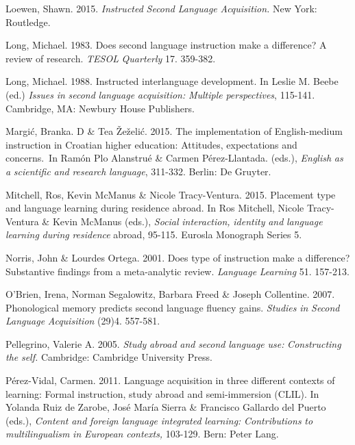 Loewen, Shawn. 2015. \textit{Instructed} \textit{Second} \textit{Language} \textit{Acquisition.} New York: Routledge.

Long, Michael. 1983. Does second language instruction make a difference? A review of research. \textit{TESOL} \textit{Quarterly} 17. 359-382.

Long, Michael. 1988. Instructed interlanguage development. In Leslie M. Beebe (ed.) \textit{Issues} \textit{in} \textit{second} \textit{language} \textit{acquisition:} \textit{Multiple} \textit{perspectives}, 115-141. Cambridge, MA: Newbury House Publishers. 

Margić, Branka. D \& Tea Žeželić. 2015. The implementation of English-medium instruction in Croatian higher education: Attitudes, expectations and concerns.{~In Ramón Plo Alanstrué \& Carmen Pérez-Llantada. (eds.),} \textit{English} \textit{as} \textit{a} \textit{scientific} \textit{and} \textit{research} \textit{language}, 311-332. Berlin: De Gruyter. 

Mitchell, Ros, Kevin McManus \& Nicole Tracy-Ventura. 2015. Placement type and language learning during residence abroad. In Ros Mitchell, Nicole Tracy-Ventura \& Kevin McManus (eds.), \textit{Social} \textit{interaction,} \textit{identity} \textit{and} \textit{language} \textit{learning} \textit{during} \textit{residence} abroad, 95-115. Eurosla Monograph Series 5.

Norris, John \& Lourdes Ortega. 2001. Does type of instruction make a difference? Substantive findings from a meta-analytic review. \textit{Language} \textit{Learning} 51. 157-213.

O’Brien, Irena, Norman Segalowitz, Barbara Freed \& Joseph Collentine. 2007. Phonological memory predicts second language fluency gains. \textit{Studies} \textit{in} \textit{Second} \textit{Language} \textit{Acquisition} (29)4. 557-581. 

Pellegrino, Valerie A. 2005. \textit{Study} \textit{abroad} \textit{and} \textit{second} \textit{language} \textit{use:} \textit{Constructing} \textit{the} \textit{self.} Cambridge: Cambridge University Press.

Pérez-Vidal, Carmen. 2011. Language acquisition in three different contexts of learning: Formal instruction, study abroad and semi-immersion (CLIL). In Yolanda Ruiz de Zarobe, José María Sierra \& Francisco Gallardo del Puerto (eds.), \textit{Content} \textit{and} \textit{foreign} \textit{language} \textit{integrated} \textit{learning:} \textit{Contributions} \textit{to} \textit{multilingualism} \textit{in} \textit{European} \textit{contexts,} 103-129. Bern: Peter Lang.

